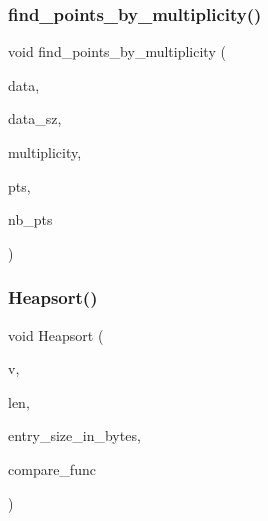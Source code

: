 \subsubsection{\texorpdfstring{find\+\_\+points\+\_\+by\+\_\+multiplicity()}{find\_points\_by\_multiplicity()}}
{\footnotesize\ttfamily void find\+\_\+points\+\_\+by\+\_\+multiplicity (\begin{DoxyParamCaption}\item[{\mbox{\hyperlink{galois_8h_a09fddde158a3a20bd2dcadb609de11dc}{I\+NT}} $\ast$}]{data,  }\item[{\mbox{\hyperlink{galois_8h_a09fddde158a3a20bd2dcadb609de11dc}{I\+NT}}}]{data\+\_\+sz,  }\item[{\mbox{\hyperlink{galois_8h_a09fddde158a3a20bd2dcadb609de11dc}{I\+NT}}}]{multiplicity,  }\item[{\mbox{\hyperlink{galois_8h_a09fddde158a3a20bd2dcadb609de11dc}{I\+NT}} $\ast$\&}]{pts,  }\item[{\mbox{\hyperlink{galois_8h_a09fddde158a3a20bd2dcadb609de11dc}{I\+NT}} \&}]{nb\+\_\+pts }\end{DoxyParamCaption})}

\mbox{\label{sorting_8_c_a2af240488f5893071c88af35d9f06b6d}} 
\subsubsection{\texorpdfstring{Heapsort()}{Heapsort()}}
{\footnotesize\ttfamily void Heapsort (\begin{DoxyParamCaption}\item[{void $\ast$}]{v,  }\item[{\mbox{\hyperlink{galois_8h_a09fddde158a3a20bd2dcadb609de11dc}{I\+NT}}}]{len,  }\item[{\mbox{\hyperlink{galois_8h_a09fddde158a3a20bd2dcadb609de11dc}{I\+NT}}}]{entry\+\_\+size\+\_\+in\+\_\+bytes,  }\item[{\mbox{\hyperlink{galois_8h_a09fddde158a3a20bd2dcadb609de11dc}{I\+NT}}($\ast$)(void $\ast$v1, void $\ast$v2)}]{compare\+\_\+func }\end{DoxyParamCaption})}

\mbox{\label{sorting_8_c_a7a9b4c4e2d2a08682f8c28beecc28ad0}} 
